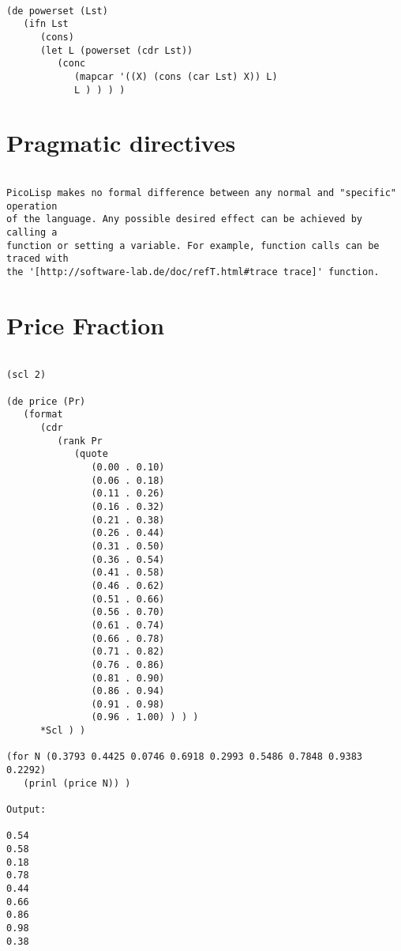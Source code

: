 \begin{verbatim}

(de powerset (Lst)
   (ifn Lst
      (cons)
      (let L (powerset (cdr Lst))
         (conc
            (mapcar '((X) (cons (car Lst) X)) L)
            L ) ) ) )

\end{verbatim}

\section*{Pragmatic directives}

\begin{verbatim}

PicoLisp makes no formal difference between any normal and "specific" operation
of the language. Any possible desired effect can be achieved by calling a
function or setting a variable. For example, function calls can be traced with
the '[http://software-lab.de/doc/refT.html#trace trace]' function.

\end{verbatim}

\section*{Price Fraction}

\begin{verbatim}

(scl 2)

(de price (Pr)
   (format
      (cdr
         (rank Pr
            (quote
               (0.00 . 0.10)
               (0.06 . 0.18)
               (0.11 . 0.26)
               (0.16 . 0.32)
               (0.21 . 0.38)
               (0.26 . 0.44)
               (0.31 . 0.50)
               (0.36 . 0.54)
               (0.41 . 0.58)
               (0.46 . 0.62)
               (0.51 . 0.66)
               (0.56 . 0.70)
               (0.61 . 0.74)
               (0.66 . 0.78)
               (0.71 . 0.82)
               (0.76 . 0.86)
               (0.81 . 0.90)
               (0.86 . 0.94)
               (0.91 . 0.98)
               (0.96 . 1.00) ) ) )
      *Scl ) )

(for N (0.3793 0.4425 0.0746 0.6918 0.2993 0.5486 0.7848 0.9383 0.2292)
   (prinl (price N)) )

Output:

0.54
0.58
0.18
0.78
0.44
0.66
0.86
0.98
0.38

\end{verbatim}

